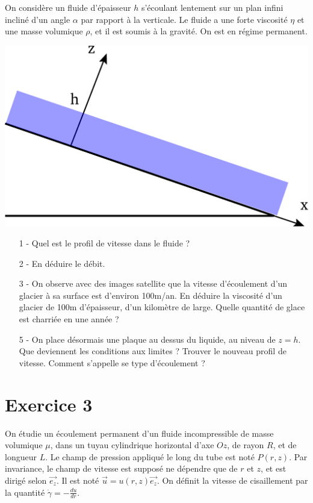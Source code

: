 \documentclass{report}
\begin{document}
On considère un fluide d'épaisseur $h$ s'écoulant lentement sur un plan infini incliné d'un angle $\alpha$ par rapport à la verticale. Le fluide a une forte viscosité $\eta$ et une masse volumique $\rho$, et il est soumis à la gravité. On est en régime permanent.

\begin{center}
	\includegraphics[scale=0.3]{ecoulement.pdf}
\end{center}

\begin{itemize}
	\item[1 -] Quel est le profil de vitesse dans le fluide ? 
	\item[2 -] En déduire le débit. 
	\item[3 -] On observe avec des images satellite que la vitesse d'écoulement d'un glacier à sa surface est d'environ 100m/an. En déduire la viscosité d'un glacier de 100m d'épaisseur, d'un kilomètre de large. Quelle quantité de glace est charriée en une année ?
	\item[5 -] On place désormais une plaque au dessus du liquide, au niveau de $z=h$. Que deviennent les conditions aux limites ? Trouver le nouveau profil de vitesse. Comment s'appelle se type d'écoulement ?

\end{itemize}

\newpage

\section*{Exercice 3}

On étudie un écoulement permanent d'un fluide incompressible de masse volumique $\mu$, dans un tuyau cylindrique horizontal d'axe $Oz$, de rayon $R$, et de longueur $L$. Le champ de pression appliqué le long du tube est noté $P(r,z)$. Par invariance, le champ de vitesse est supposé ne dépendre que de $r$ et $z$, et est dirigé selon $\vec{e_z}$. Il est noté $\vec{u}=u(r,z)\vec{e_z}$. On définit la vitesse de cisaillement par la quantité $\dot{\gamma}=-\frac{du}{dr}$. 
\end{document}
